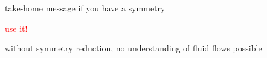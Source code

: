 \begin{frame}{\Large take-home message}
if you have a symmetry
\begin{center}
\textcolor{red}{\Large use it!}
\end{center}

\bigskip\bigskip
without symmetry reduction, no understanding of fluid
flows possible
\end{frame}





